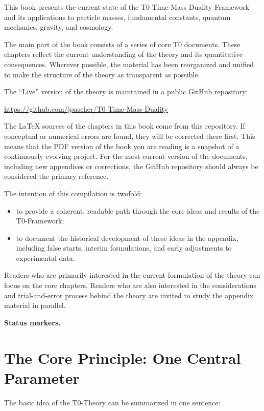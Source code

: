 	This book presents the current state of the T0 Time-Mass Duality Framework and its applications to particle masses, fundamental constants, quantum mechanics, gravity, and cosmology.
	
	The main part of the book consists of a series of core T0 documents. These chapters reflect the current understanding of the theory and its quantitative consequences. Wherever possible, the material has been reorganized and unified to make the structure of the theory as transparent as possible.
	
	The ``Live'' version of the theory is maintained in a public GitHub repository:
	\begin{center}
		\url{https://github.com/jpascher/T0-Time-Mass-Duality}
	\end{center}
	
	The \LaTeX{} sources of the chapters in this book come from this repository. If conceptual or numerical errors are found, they will be corrected there first. This means that the PDF version of the book you are reading is a snapshot of a continuously evolving project. For the most current version of the documents, including new appendices or corrections, the GitHub repository should always be considered the primary reference.
	
	The intention of this compilation is twofold:
	\begin{itemize}
		\item to provide a coherent, readable path through the core ideas and results of the T0-Framework;
		\item to document the historical development of these ideas in the appendix, including false starts, interim formulations, and early adjustments to experimental data.
	\end{itemize}
	
	Readers who are primarily interested in the current formulation of the theory can focus on the core chapters. Readers who are also interested in the considerations and trial-and-error process behind the theory are invited to study the appendix material in parallel.

	\medskip\noindent\textbf{Status markers.}
	
	
	\section{The Core Principle: One Central Parameter}
	The basic idea of the T0-Theory can be summarized in one sentence:
	
